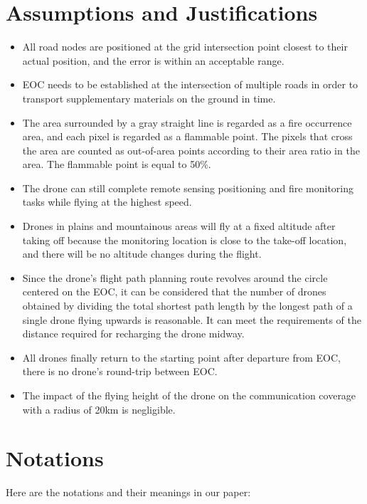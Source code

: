 \documentclass{mcmthesis}
\begin{document}
\section{Assumptions and Justifications}
\begin{itemize}
  \item All road nodes are positioned at the grid intersection point closest to their actual position, and the error is within an acceptable range.

  \item EOC needs to be established at the intersection of multiple roads in order to transport supplementary materials on the ground in time.
  
  \item The area surrounded by a gray straight line is regarded as a fire occurrence area, and each pixel is regarded as a flammable point. The pixels that cross the area are counted as out-of-area points according to their area ratio in the area. The flammable point is equal to 50\%.
  
  \item The drone can still complete remote sensing positioning and fire monitoring tasks while flying at the highest speed.
  
  \item Drones in plains and mountainous areas will fly at a fixed altitude after taking off because the monitoring location is close to the take-off location, and there will be no altitude changes during the flight.
  
  \item Since the drone’s flight path planning route revolves around the circle centered on the EOC, it can be considered that the number of drones obtained by dividing the total shortest path length by the longest path of a single drone flying upwards is reasonable. It can meet the requirements of the distance required for recharging the drone midway.
  
  \item All drones finally return to the starting point after departure from EOC, there is no drone's round-trip between EOC.
  
  \item The impact of the flying height of the drone on the communication coverage with a radius of 20km is negligible.
  
\end{itemize}



\section{Notations}
Here are the notations and their meanings in our paper:
\end{document}
